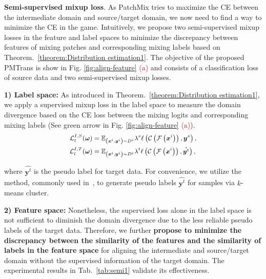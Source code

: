 \documentclass[10pt,twocolumn,letterpaper, ]{article}
\begin{document}
\noindent\textbf{Semi-supervised mixup loss}. 
As PatchMix tries to maximize the CE between the intermediate domain and source/target domain, we now need to find a way to minimize the CE in the game. Intuitively, we propose two semi-supervised mixup losses in the feature and label spaces to minimize the discrepancy between features of mixing patches and corresponding mixing labels based on Theorem.~\ref{theorem:Distribution estimation1}. The objective of the proposed PMTrans is show in Fig. \ref{fig:align-feature} \textcolor{red}{(a)} and consists of a classification loss of source data and two semi-supervised mixup losses.

\textbf{ 1) Label space:} As introduced in Theorem.~\ref{theorem:Distribution estimation1}, we apply a supervised mixup loss in the label space to measure the domain divergence based on the CE loss between the mixing logits and corresponding mixing labels (See \textcolor{green(pigment)}{green arrow} in Fig. \ref{fig:align-feature} \textcolor{red}{(a)}). 
{\setlength\abovedisplayskip{3pt}
\setlength\belowdisplayskip{3pt}
\begin{equation}
\small
    \begin{aligned}
 \mathcal{L}_{l}^{I,S}(\boldsymbol{\omega}) &= \mathbb{E}_{\left(\boldsymbol{x}^{i}, \boldsymbol{y}^{i}\right) \sim D^{i}} \lambda^{s} \ell\left(\mathcal{C}\left(\mathcal {F}\left(\boldsymbol{x}^{i}\right)\right), \boldsymbol{y}^{s}\right),\\
\mathcal{L}_{l}^{I,T}(\boldsymbol{\omega}) &= \mathbb{E}_{\left(\boldsymbol{x}^{i}, \boldsymbol{y}^{i}\right) \sim D^{i}} \lambda^{t} \ell\left(\mathcal{C}\left(\mathcal {F}\left(\boldsymbol{x}^{i}\right)\right), \hat{\boldsymbol{y}^{t}}\right), \nonumber
    \end{aligned}
\end{equation}}

where $\hat{\boldsymbol{y}^{t}}$ is the pseudo label for target data. For convenience, we utilize the method, commonly used in~\cite{LiangHF20, LiangHF21}, to generate pseudo labels $ \hat{\boldsymbol{y}^{t}}$ for samples via $k$-means cluster. 

\textbf{2) Feature space:} Nonetheless, the supervised loss alone in the label space is
not sufficient to diminish the domain divergence due to the less reliable pseudo labels of the target data. 
Therefore, we further  \textbf{propose to minimize the discrepancy between the similarity of the features and the similarity of labels in the feature space} for aligning the intermediate and source/target domain without the supervised information of the target domain. The experimental results in Tab.~\ref{tab:semi1} validate its effectiveness.
\end{document}
